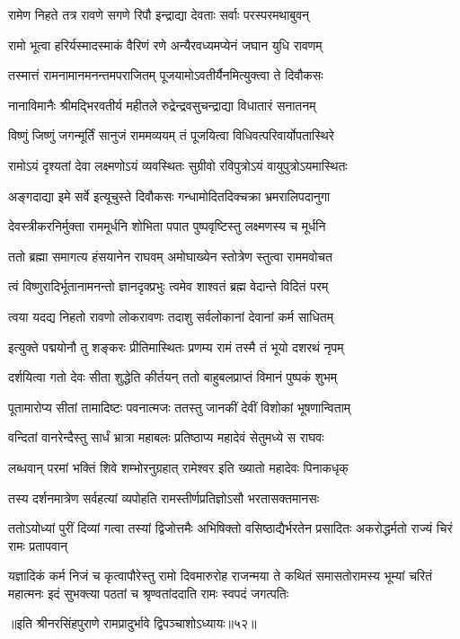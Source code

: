 \twolineshloka
{रामेण निहते तत्र रावणे सगणे रिपौ}
{इन्द्राद्या देवताः सर्वाः परस्परमथाबुवन्} %

\twolineshloka
{रामो भूत्वा हरिर्यस्मादस्माकं वैरिणं रणे}
{अन्यैरवध्यमप्येनं जघान युधि रावणम्} %

\twolineshloka
{तस्मात्तं रामनामानमनन्तमपराजितम्}
{पूजयामोऽवतीर्यैनमित्युक्त्वा ते दिवौकसः} %

\twolineshloka
{नानाविमानैः श्रीमद्भिरवतीर्य महीतले}
{रुद्रेन्द्रवसुचन्द्राद्या विधातारं सनातनम्} %

\twolineshloka
{विष्णुं जिष्णुं जगन्मूर्तिं सानुजं राममव्ययम्}
{तं पूजयित्वा विधिवत्परिवार्योपतास्थिरे} %

\twolineshloka
{रामोऽयं दृश्यतां देवा लक्ष्मणोऽयं व्यवस्थितः}
{सुग्रीवो रविपुत्रोऽयं वायुपुत्रोऽयमास्थितः} %

\twolineshloka
{अङ्गदाद्या इमे सर्वे इत्यूचुस्ते दिवौकसः}
{गन्धामोदितदिक्चक्रा भ्रमरालिपदानुगा} %

\twolineshloka
{देवस्त्रीकरनिर्मुक्ता राममूर्धनि शोभिता}
{पपात पुष्पवृष्टिस्तु लक्ष्मणस्य च मूर्धनि} %

\twolineshloka
{ततो ब्रह्मा समागत्य हंसयानेन राघवम्}
{अमोघाख्येन स्तोत्रेण स्तुत्वा राममवोचत} %


\twolineshloka
{त्वं विष्णुरादिर्भूतानामनन्तो ज्ञानदृक्प्रभुः}
{त्वमेव शाश्वतं ब्रह्म वेदान्ते विदितं परम्} %

\twolineshloka
{त्वया यदद्य निहतो रावणो लोकरावणः}
{तदाशु सर्वलोकानां देवानां कर्म साधितम्} %

\twolineshloka
{इत्युक्ते पद्मयोनौ तु शङ्करः प्रीतिमास्थितः}
{प्रणम्य रामं तस्मै तं भूयो दशरथं नृपम्} %

\twolineshloka
{दर्शयित्वा गतो देवः सीता शुद्धेति कीर्तयन्}
{ततो बाहुबलप्राप्तं विमानं पुष्पकं शुभम्} %

\twolineshloka
{पूतामारोप्य सीतां तामादिष्टः पवनात्मजः}
{ततस्तु जानकीं देवीं विशोकां भूषणान्विताम्} %

\twolineshloka
{वन्दितां वानरेन्दैस्तु सार्धं भ्रात्रा महाबलः}
{प्रतिष्ठाप्य महादेवं सेतुमध्ये स राघवः} %

\twolineshloka
{लब्धवान् परमां भक्तिं शिवे शम्भोरनुग्रहात्}
{रामेश्वर इति ख्यातो महादेवः पिनाकधृक्} %

\twolineshloka
{तस्य दर्शनमात्रेण सर्वहत्यां व्यपोहति}
{रामस्तीर्णप्रतिज्ञोऽसौ भरतासक्तमानसः} %

\threelineshloka
{ततोऽयोध्यां पुरीं दिव्यां गत्वा तस्यां द्विजोत्तमैः}
{अभिषिक्तो वसिष्ठाद्यैर्भरतेन प्रसादितः}
{अकरोद्धर्मतो राज्यं चिरं रामः प्रतापवान्} %

\sixlineindentedshloka
{यज्ञादिकं कर्म निजं च कृत्वा}{पौरेस्तु रामो दिवमारुरोह}
{राजन्मया ते कथितं समासतो}{रामस्य भूम्यां चरितं महात्मनः}
{इदं सुभक्त्या पठतां च श्रृण्वतां}{ददाति रामः स्वपदं जगत्पतिः} %

॥इति श्रीनरसिंहपुराणे रामप्रादुर्भावे द्विपञ्चाशोऽध्यायः॥५२॥

\closesection